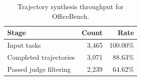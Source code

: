 \begin{table}[t]
\centering
\small
{\begin{tabular}{lrr}
\toprule
\textbf{Stage} & \textbf{Count} & \textbf{Rate} \\
\midrule
Input tasks & 3,465 & 100.00\% \\
Completed trajectories & 3,071 & 88.63\% \\
Passed judge filtering  & 2,239 & 64.62\% \\
\bottomrule
\end{tabular}
}
\caption{Trajectory synthesis throughput for OfficeBench.}
\label{tab:ob_trajectory_stats}
\end{table}
